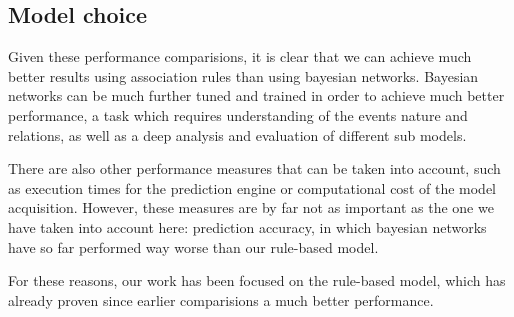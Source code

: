 \documentclass[a4paper,12pt]{article}
\begin{document}
\subsection{Model choice}
Given these performance comparisions, it is clear that we can achieve much better results using association rules than using bayesian networks. Bayesian networks can be much further tuned and trained in order to achieve much better performance, a task which requires understanding of the events nature and relations, as well as a deep analysis and evaluation of different sub models.

There are also other performance measures that can be taken into account, such as execution times for the prediction engine or computational cost of the model acquisition. However, these measures are by far not as important as the one we have taken into account here: prediction accuracy, in which bayesian networks have so far performed way worse than our rule-based model. 

For these reasons, our work has been focused on the rule-based model, which has already proven since earlier comparisions a much better performance.


\clearpage

 

\end{document}
